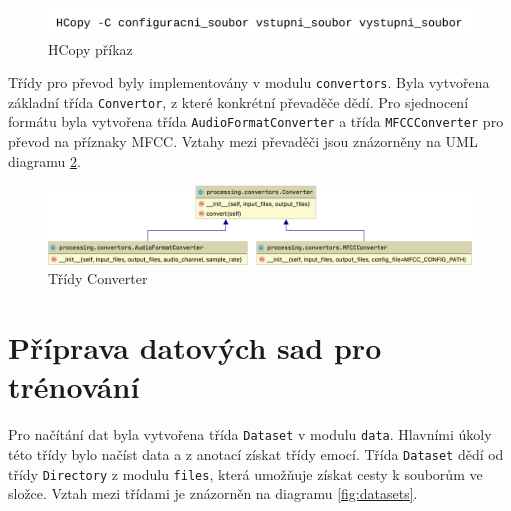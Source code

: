 \documentclass[FM,BP]{tulthesis}
\begin{document}
\begin{figure}[htbp]
\centerline{\includegraphics[width=\textwidth,height=\textheight,keepaspectratio]{htk_command.png}}
\caption{HCopy příkaz}
\label{fig:htk}
\end{figure}
\FloatBarrier

Třídy pro převod byly implementovány v modulu \texttt{\mbox{convertors}}. Byla vytvořena základní třída \texttt{\mbox{Convertor}}, z které konkrétní převaděče dědí. Pro sjednocení formátu byla vytvořena třída \texttt{\mbox{AudioFormatConverter}} a třída \texttt{\mbox{MFCCConverter}} pro převod na příznaky MFCC. Vztahy mezi převaděči jsou znázorněny na UML diagramu \mbox{\ref{fig:convertor}}.

\begin{figure}[ht]
\centerline{\includegraphics[width=\textwidth,height=\textheight,keepaspectratio]{convertors.png}}
\caption{Třídy Converter}
\label{fig:convertor}
\end{figure}
\FloatBarrier

\section{Příprava datových sad pro trénování} %
Pro načítání dat byla vytvořena třída \texttt{\mbox{Dataset}} v modulu \texttt{\mbox{data}}. Hlavními úkoly této třídy bylo načíst data a z anotací získat třídy emocí. Třída \texttt{\mbox{Dataset}} dědí od třídy \texttt{\mbox{Directory}} z modulu \texttt{\mbox{files}}, která umožňuje získat cesty k souborům ve složce. Vztah mezi třídami je znázorněn na diagramu \mbox{\ref{fig:datasets}}.
\end{document}
